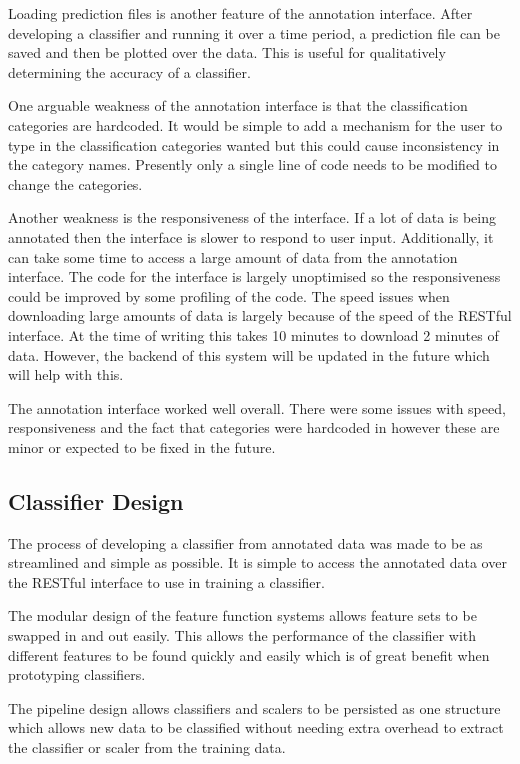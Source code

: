 Loading prediction files is another feature of the annotation interface. After developing a classifier and running it over a time period, a prediction file can be saved and then be plotted over the data. This is useful for qualitatively determining the accuracy of a classifier. 

One arguable weakness of the annotation interface is that the classification categories are hardcoded. It would be simple to add a mechanism for the user to type in the classification categories wanted but this could cause inconsistency in the category names. Presently only a single line of code needs to be modified to change the categories. 

Another weakness is the responsiveness of the interface. If a lot of data is being annotated then the interface is slower to respond to user input. Additionally, it can take some time to access a large amount of data from the annotation interface. The code for the interface is largely unoptimised so the responsiveness could be improved by some profiling of the code. The speed issues when downloading large amounts of data is largely because of the speed of the RESTful interface. At the time of writing this takes 10 minutes to download 2 minutes of data. However, the backend of this system will be updated in the future which will help with this. 

The annotation interface worked well overall. There were some issues with speed, responsiveness and the fact that categories were hardcoded in however these are minor or expected to be fixed in the future. 

\subsection{Classifier Design}

The process of developing a classifier from annotated data was made to be as streamlined and simple as possible. It is simple to access the annotated data over the RESTful interface to use in training a classifier. 

The modular design of the feature function systems allows feature sets to be swapped in and out easily. This allows the performance of the classifier with different features to be found quickly and easily which is of great benefit when prototyping classifiers. 

The pipeline design allows classifiers and scalers to be persisted as one structure which allows new data to be classified without needing extra overhead to extract the classifier or scaler from the training data. 

